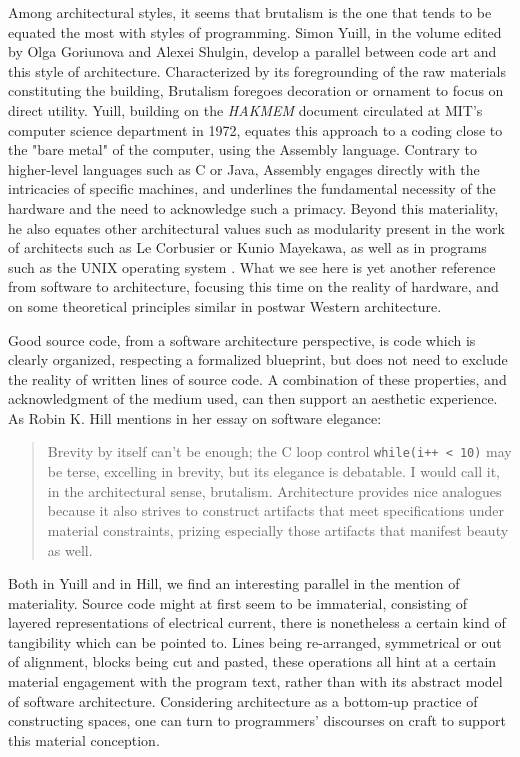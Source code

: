 Among architectural styles, it seems that brutalism is the one that tends to be equated the most with styles of programming. Simon Yuill, in the volume edited by Olga Goriunova and Alexei Shulgin, develop a parallel between code art and this style of architecture. Characterized by its foregrounding of the raw materials constituting the building, Brutalism foregoes decoration or ornament to focus on direct utility. Yuill, building on the \emph{HAKMEM} document circulated at MIT's computer science department in 1972, equates this approach to a coding close to the "bare metal" of the computer, using the Assembly language. Contrary to higher-level languages such as C or Java, Assembly engages directly with the intricacies of specific machines, and underlines the fundamental necessity of the hardware and the need to acknowledge such a primacy. Beyond this materiality, he also equates other architectural values such as modularity present in the work of architects such as Le Corbusier or Kunio Mayekawa, as well as in programs such as the UNIX operating system \citep{yuill_code_2004}. What we see here is yet another reference from software to architecture, focusing this time on the reality of hardware, and on some theoretical principles similar in postwar Western architecture.

Good source code, from a software architecture perspective, is code which is clearly organized, respecting a formalized blueprint, but does not need to exclude the reality of written lines of source code. A combination of these properties, and acknowledgment of the medium used, can then support an aesthetic experience. As Robin K. Hill mentions in her essay on software elegance:

\begin{quote}
  Brevity by itself can't be enough; the C loop control \lstinline{while(i++ < 10)} may be terse, excelling in brevity, but its elegance is debatable. I would call it, in the architectural sense, brutalism. Architecture provides nice analogues because it also strives to construct artifacts that meet specifications under material constraints, prizing especially those artifacts that manifest beauty as well. \citep{hill_what_2016}
\end{quote}

Both in Yuill and in Hill, we find an interesting parallel in the mention of materiality. Source code might at first seem to be immaterial, consisting of layered representations of electrical current, there is nonetheless a certain kind of tangibility which can be pointed to. Lines being re-arranged, symmetrical or out of alignment, blocks being cut and pasted, these operations all hint at a certain material engagement with the program text, rather than with its abstract model of software architecture. Considering architecture as a bottom-up practice of constructing spaces, one can turn to programmers' discourses on craft to support this material conception.

